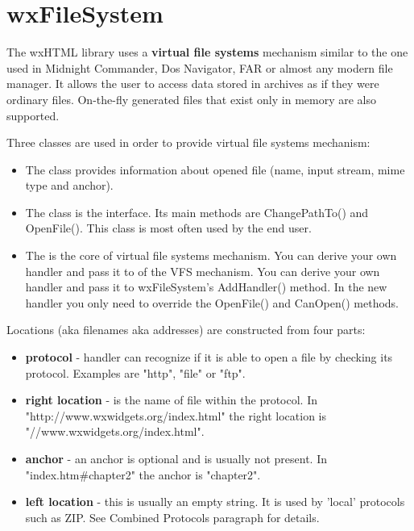 \section{wxFileSystem}\label{fs}

The wxHTML library uses a {\bf virtual file systems} mechanism
similar to the one used in Midnight Commander, Dos Navigator,
FAR or almost any modern file manager. It allows the user to access
data stored in archives as if they were ordinary files. On-the-fly
generated files that exist only in memory are also supported.


Three classes are used in order to provide virtual file systems mechanism:

\begin{itemize}\itemsep=0pt
\item The  class provides information
about opened file (name, input stream, mime type and anchor).
\item The  class is the interface.
Its main methods are ChangePathTo() and OpenFile(). This class
is most often used by the end user.
\item The  is the core
of virtual file systems mechanism. You can derive your own handler and pass it to
of the VFS mechanism. You can derive your own handler and pass it to
wxFileSystem's AddHandler() method. In the new handler you only need to
override the OpenFile() and CanOpen() methods.
\end{itemize}


Locations (aka filenames aka addresses) are constructed from four parts:

\begin{itemize}\itemsep=0pt
\item {\bf protocol} - handler can recognize if it is able to open a
file by checking its protocol. Examples are "http", "file" or "ftp".
\item {\bf right location} - is the name of file within the protocol.
In "http://www.wxwidgets.org/index.html" the right location is "//www.wxwidgets.org/index.html".
\item {\bf anchor} - an anchor is optional and is usually not present.
In "index.htm\#chapter2" the anchor is "chapter2".
\item {\bf left location} - this is usually an empty string. 
It is used by 'local' protocols such as ZIP.
See Combined Protocols paragraph for details.
\end{itemize}

